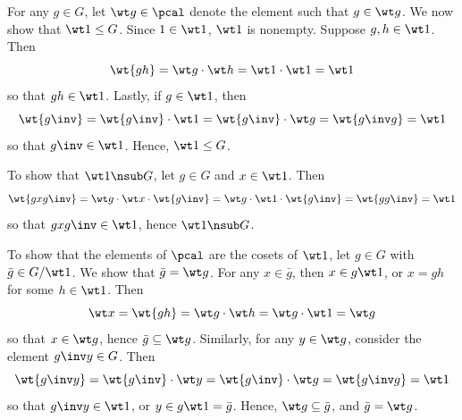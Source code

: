 \begin{sol}
    For any $g \in G$, let $\wt g \in \pcal$ denote the element such that $g \in \wt g$.
	We now show that $\wt 1 \leq G$.
	Since $1 \in \wt 1$, $\wt 1$ is nonempty.
	Suppose $g, h \in \wt 1$.
	Then
    \[
    	\wt{gh} = \wt g \cdot \wt h = \wt 1 \cdot \wt 1 = \wt 1
    \]
    so that $gh \in \wt 1$.
	Lastly, if $g \in \wt 1$, then
    \[
    	\wt{g\inv} = \wt{g\inv} \cdot \wt 1 = \wt{g\inv} \cdot \wt g = \wt{g\inv g} = \wt 1
    \]
    so that $g\inv \in \wt 1$.
	Hence, $\wt 1 \leq G$.

    To show that $\wt 1 \nsub G$, let $g \in G$ and $x \in \wt 1$.
	Then
    \[
    	\wt{gxg\inv} = \wt g \cdot \wt x \cdot \wt{g\inv} = \wt g \cdot \wt 1 \cdot \wt{g\inv} = \wt{gg\inv} = \wt 1
    \]
    so that $gxg\inv \in \wt 1$, hence $\wt 1 \nsub G$.

    To show that the elements of $\pcal$ are the cosets of $\wt 1$, let $g \in G$ with $\bar g \in G/\wt 1$.
	We show that $\bar g = \wt g$.
	For any $x \in \bar g$, then $x \in g\wt 1$, or $x = gh$ for some $h \in \wt 1$.
	Then
    \[
    	\wt x = \wt{gh} = \wt g \cdot \wt h = \wt g \cdot \wt 1 = \wt g
    \]
    so that $x \in \wt g$, hence $\bar g \subseteq \wt g$.
	Similarly, for any $y \in \wt g$, consider the element $g\inv y \in G$.
	Then
    \[
    	\wt{g\inv y} = \wt{g\inv} \cdot \wt y = \wt{g\inv} \cdot \wt g = \wt{g\inv g} = \wt 1
    \]
    so that $g\inv y \in \wt 1$, or $y \in g\wt 1 = \bar g$.
	Hence, $\wt g \subseteq \bar g$, and $\bar g = \wt g$.
\end{sol}